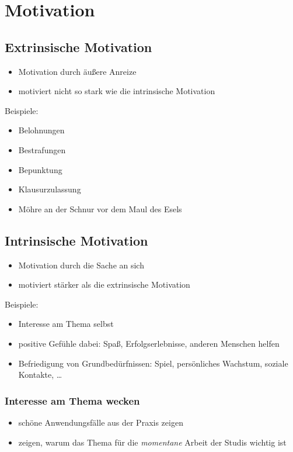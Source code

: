 \chapter{Motivation}

\section{Extrinsische Motivation}
\begin{itemize}
  \item Motivation durch äußere Anreize
  \item motiviert nicht so stark wie die intrinsische Motivation
\end{itemize}

Beispiele:

\begin{itemize}
  \item Belohnungen
  \item Bestrafungen
  \item Bepunktung
  \item Klausurzulassung
  \item Möhre an der Schnur vor dem Maul des Esels
\end{itemize}


\section{Intrinsische Motivation}
\begin{itemize}
  \item Motivation durch die Sache an sich
  \item motiviert stärker als die extrinsische Motivation
\end{itemize}

Beispiele:

\begin{itemize}
  \item Interesse am Thema selbst
  \item positive Gefühle dabei: Spaß, Erfolgserlebnisse, anderen Menschen helfen
  \item Befriedigung von Grundbedürfnissen: Spiel, persönliches Wachstum, soziale Kontakte, \ldots
\end{itemize}

\subsection{Interesse am Thema wecken}
\begin{itemize}
  \item schöne Anwendungsfälle aus der Praxis zeigen
  \item zeigen, warum das Thema für die \emph{momentane} Arbeit der Studis wichtig ist
\end{itemize}
